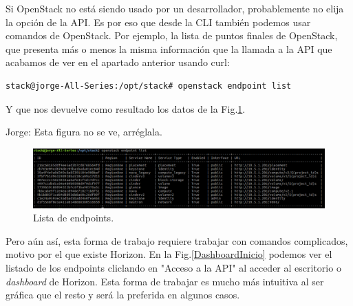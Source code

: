 Si OpenStack no está siendo usado por un desarrollador, probablemente no elija la opción de la API. Es por eso que desde la CLI también podemos usar comandos de OpenStack. Por ejemplo, la lista de puntos finales de OpenStack, que presenta más o menos la misma información que la llamada a la API que acabamos de ver en el apartado anterior usando curl:

\begin{lstlisting}[style=Consola]
stack@jorge-All-Series:/opt/stack# openstack endpoint list
\end{lstlisting}

Y que nos devuelve como resultado los datos de la Fig.\ref{endpointlist}.

\begin{tcolorbox}[colback=orange!5!white,colframe=orange!75!black]
Jorge: Esta figura no se ve, arréglala.
\end{tcolorbox}


\begin{figure}
    \centering
    \includegraphics[width=1\textwidth]{imagenes/capitulo4/endpointlist.png}
    \caption{Lista de endpoints.}
	\vspace{0.3cm}
    \label{endpointlist}
\end{figure}

Pero aún así, esta forma de trabajo requiere trabajar con comandos complicados, motivo por el que existe Horizon. En la Fig.\ref{DashboardInicio} podemos ver el listado de los endpoints cliclando en "Acceso a la API" al acceder al escritorio o \textit{dashboard} de Horizon. Esta forma de trabajar es mucho más intuitiva al ser gráfica que el resto y será la preferida en algunos casos.


